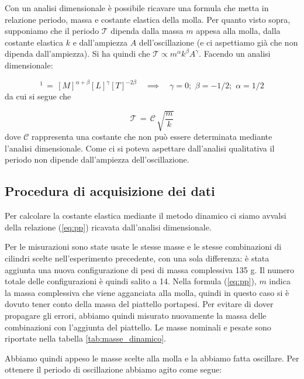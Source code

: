 Con un analisi dimensionale è possibile ricavare una formula che metta in relazione periodo, massa e costante elastica della molla.
Per quanto visto sopra, supponiamo che il periodo $\mathcal{T}$ dipenda dalla massa $m$ appesa alla molla, dalla costante elastica $k$
e dall'ampiezza $A$ dell'oscillazione (e ci aspettiamo già che non dipenda dall'ampiezza).
Si ha quindi che $\mathcal{T} \propto m^\alpha k^\beta A^\gamma$. Facendo un analisi dimensionale:

\begin{equation*}
    [\mathcal{T}]^1 \,=\, [M]^{\alpha+\beta} [L]^\gamma [T]^{-2\beta} \quad \implies \quad \gamma = 0; \,\, \beta = -1/2; \,\, \alpha = 1/2
\end{equation*}
%
da cui si segue che

\begin{equation}
	\mathcal{T} \,=\, \mathcal{C} \, \sqrt{\frac{m}{k}}
    \label{eq:pp}
\end{equation}
%
dove $\mathcal{C}$ rappresenta una costante che non può essere determinata mediante l'analisi dimensionale. Come ci si poteva aspettare
dall'analisi qualitativa il periodo non dipende dall'ampiezza dell'oscillazione.

\subsection{Procedura di acquisizione dei dati}

Per calcolare la costante elastica mediante il metodo dinamico ci siamo avvalsi della relazione (\ref{eq:pp})
ricavata dall'analisi dimensionale.

Per le misurazioni sono state usate le stesse masse e le stesse combinazioni di cilindri scelte nell'esperimento precedente, con una sola differenza: è stata aggiunta una nuova configurazione di pesi di massa complessiva 135 g. Il numero totale delle configurazioni è quindi salito a 14.
Nella formula (\ref{eq:pp}), $m$ indica la massa complessiva che viene agganciata alla molla, quindi in questo caso si è dovuto tener conto della massa del piattello portapesi. Per evitare di dover propagare gli errori, abbiamo quindi misurato nuovamente la massa delle combinazioni
con l'aggiunta del piattello. Le masse nominali e pesate sono riportate nella tabella \ref{tab:masse_dinamico}.

Abbiamo quindi appeso le masse scelte alla molla e la abbiamo fatta oscillare.
Per ottenere il periodo di oscillazione abbiamo agito come segue:

